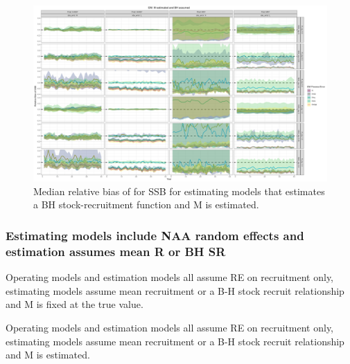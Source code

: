 \documentclass[
  12pt,
]{article}
\begin{document}
\begin{landscape}
\begin{figure}
\caption{Median relative bias of for SSB for estimating models that estimates a BH stock-recruitment function and M is estimated.}\label{naa_om_em_SR_ME_relbias_ssb}
\begin{center}
\includegraphics[width = \textwidth]{naa_om_SR_ME_relbias_ssb.png}
\end{center}
\end{figure}
\end{landscape}

\hypertarget{estimating-models-include-naa-random-effects-and-estimation-assumes-mean-r-or-bh-sr}{%
\subsubsection{Estimating models include NAA random effects and
estimation assumes mean R or BH
SR}\label{estimating-models-include-naa-random-effects-and-estimation-assumes-mean-r-or-bh-sr}}

\clearpage

\begin{table}
\caption{Operating models and estimation models all assume RE on recruitment only, estimating models assume mean recruitment or a B-H stock recruit relationship and M is fixed at the true value.}
{}
\end{table}

\begin{table}
\caption{Operating models and estimation models all assume RE on recruitment only, estimating models assume mean recruitment or a B-H stock recruit relationship and M is estimated.}
{}
\end{table}
\end{document}
